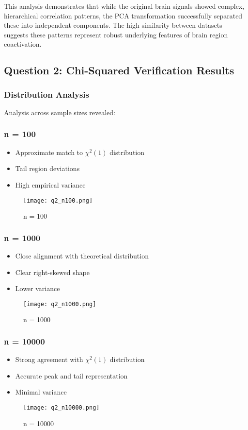 \documentclass[12pt]{article}
\begin{document}
This analysis demonstrates that while the original brain signals showed complex, hierarchical correlation patterns, the PCA transformation successfully separated these into independent components. The high similarity between datasets suggests these patterns represent robust underlying features of brain region coactivation.


\subsection{Question 2: Chi-Squared Verification Results}

\subsubsection{Distribution Analysis}
Analysis across sample sizes revealed:

\subsubsection{n = 100}
\begin{itemize}
    \item Approximate match to $\chi^2(1)$ distribution
    \item Tail region deviations
    \item High empirical variance
\end{itemize}
\begin{figure}[H]
    \centering
    \texttt{[image: q2\_n100.png]}
    \caption{n = 100}
    \label{fig:enter-label}
\end{figure}
\subsubsection{n = 1000}
\begin{itemize}
    \item Close alignment with theoretical distribution
    \item Clear right-skewed shape
    \item Lower variance
\end{itemize}
\begin{figure}[H]
    \centering
    \texttt{[image: q2\_n1000.png]}
    \caption{n = 1000}
    \label{fig:enter-label}
\end{figure}
\subsubsection{n = 10000}
\begin{itemize}
    \item Strong agreement with $\chi^2(1)$ distribution
    \item Accurate peak and tail representation
    \item Minimal variance
\end{itemize}
\begin{figure}[H]
    \centering
    \texttt{[image: q2\_n10000.png]}
    \caption{n = 10000}
    \label{fig:enter-label}
\end{figure}
\end{document}
